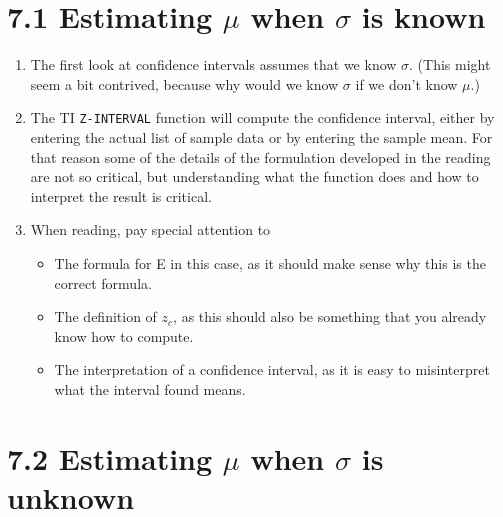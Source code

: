 \documentclass{article}
\begin{document}
\section*{7.1 Estimating $\mu$ when $\sigma$ is known}

\begin{enumerate}

    \item The first look at confidence intervals assumes that we know $\sigma$.  (This might seem a bit contrived, because why would we know $\sigma$ if we don’t know $\mu$.)
    
    \item The TI \texttt{Z-INTERVAL} function will compute the confidence interval, either by entering the actual list of sample data or by entering the sample mean. For that reason some of the details of the formulation developed in the reading are not so critical, but understanding what the function does and how to interpret the result is critical.
    
    \item When reading, pay special attention to
    
        \begin{itemize}
        
            \item The formula for E in this case, as it should make sense why this is the correct formula.
            
            \item The definition of $z_c$, as this should also be something that you already know how to compute.
            
            \item The interpretation of a confidence interval, as it is easy to misinterpret what the interval found means.
            
        \end{itemize}
        
\end{enumerate}

\section*{7.2 Estimating $\mu$ when $\sigma$ is unknown}
\end{document}
